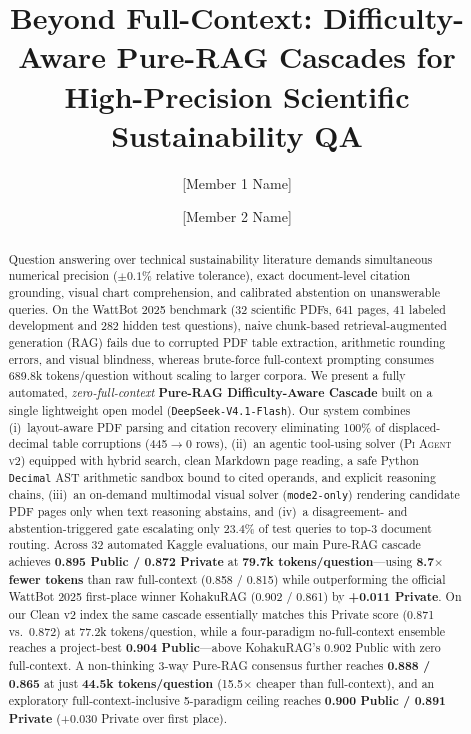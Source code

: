 \documentclass[sigconf,nonacm]{acmart}
\title{Beyond Full-Context: Difficulty-Aware Pure-RAG Cascades for High-Precision Scientific Sustainability QA}
\author{[Member 1 Name]}
\affiliation{%
  \institution{The Hong Kong University of Science and Technology (Guangzhou)}
  \department{DSA5020 Final Project (Student ID: [ID-1])}
  \city{Guangzhou}
  \country{China}
}
\author{[Member 2 Name]}
\affiliation{%
  \institution{The Hong Kong University of Science and Technology (Guangzhou)}
  \department{DSA5020 Final Project (Student ID: [ID-2])}
  \city{Guangzhou}
  \country{China}
}
\newcommand{\code}[1]{\texttt{\small #1}}
\begin{document}
\begin{abstract}
Question answering over technical sustainability literature demands simultaneous numerical precision ($\pm 0.1\%$ relative tolerance), exact document-level citation grounding, visual chart comprehension, and calibrated abstention on unanswerable queries.
On the WattBot 2025 benchmark (32 scientific PDFs, 641 pages, 41 labeled development and 282 hidden test questions), naive chunk-based retrieval-augmented generation (RAG) fails due to corrupted PDF table extraction, arithmetic rounding errors, and visual blindness, whereas brute-force full-context prompting consumes 689.8k tokens/question without scaling to larger corpora.
We present a fully automated, \emph{zero-full-context} \textbf{Pure-RAG Difficulty-Aware Cascade} built on a single lightweight open model (\code{DeepSeek-V4.1-Flash}).
Our system combines (i)~layout-aware PDF parsing and citation recovery eliminating 100\% of displaced-decimal table corruptions (445$\to$0 rows), (ii)~an agentic tool-using solver (\textsc{Pi Agent v2}) equipped with hybrid search, clean Markdown page reading, a safe Python \code{Decimal} AST arithmetic sandbox bound to cited operands, and explicit reasoning chains, (iii)~an on-demand multimodal visual solver (\code{mode2-only}) rendering candidate PDF pages only when text reasoning abstains, and (iv)~a disagreement- and abstention-triggered gate escalating only 23.4\% of test queries to top-3 document routing.
Across 32 automated Kaggle evaluations, our main Pure-RAG cascade achieves \textbf{0.895 Public / 0.872 Private} at \textbf{79.7k tokens/question}---using \textbf{8.7$\times$ fewer tokens} than raw full-context (0.858 / 0.815) while outperforming the official WattBot 2025 first-place winner KohakuRAG (0.902 / 0.861) by \textbf{+0.011 Private}.
On our Clean v2 index the same cascade essentially matches this Private score (0.871 vs.\ 0.872) at 77.2k tokens/question, while a four-paradigm no-full-context ensemble reaches a project-best \textbf{0.904 Public}---above KohakuRAG's 0.902 Public with zero full-context.
A non-thinking 3-way Pure-RAG consensus further reaches \textbf{0.888 / 0.865} at just \textbf{44.5k tokens/question} (15.5$\times$ cheaper than full-context), and an exploratory full-context-inclusive 5-paradigm ceiling reaches \textbf{0.900 Public / 0.891 Private} (+0.030 Private over first place).
\end{abstract}

\maketitle
\end{document}
